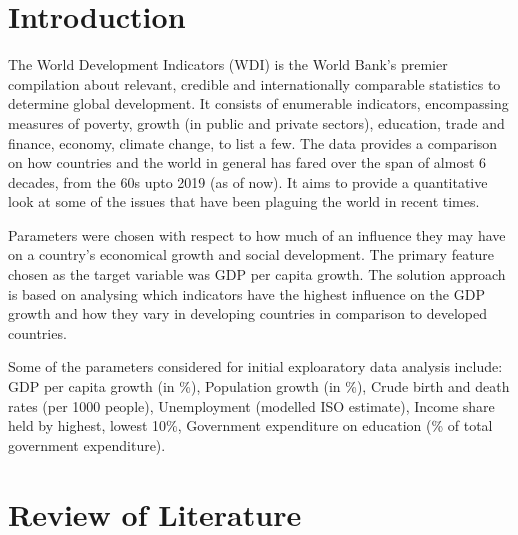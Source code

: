 \documentclass[conference]{IEEEtran}
\begin{document}
\section{Introduction}
The World Development Indicators (WDI) is the World Bank’s premier compilation 
about relevant, credible and internationally comparable statistics to determine 
global development. It consists of enumerable indicators, encompassing measures 
of poverty, growth (in public and private sectors), education, trade and finance, 
economy, climate change, to list a few. The data provides a comparison on how 
countries and the world in general has fared over the span of almost 6 decades, 
from the 60s upto 2019 (as of now). It aims to provide a quantitative look at 
some of the issues that have been plaguing the world in recent times.

Parameters were chosen with respect to how much of an influence they may have 
on a country's economical growth and social development. The primary feature chosen
as the target variable was GDP per capita growth. The solution approach is based on 
analysing which indicators have the highest influence on the GDP growth and how they 
vary in developing countries in comparison to developed countries.

Some of the parameters considered for initial exploaratory data analysis include: 
GDP per capita growth (in \%), 
Population growth (in \%), 
Crude birth and death rates (per 1000 people), 
Unemployment (modelled ISO estimate), 
Income share held by highest, lowest 10\%, 
Government expenditure on education (\% of total government expenditure).



\section{Review of Literature}
\end{document}
